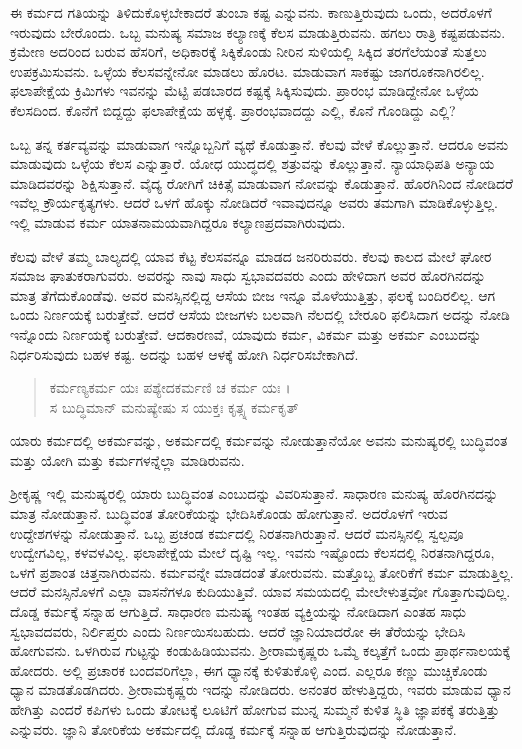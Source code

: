 ಈ ಕರ್ಮದ ಗತಿಯನ್ನು ತಿಳಿದುಕೊಳ್ಳಬೇಕಾದರೆ ತುಂಬಾ ಕಷ್ಟ ಎನ್ನುವನು. ಕಾಣುತ್ತಿರುವುದು ಒಂದು, ಅದರೊಳಗೆ ಇರುವುದು ಬೇರೊಂದು. ಒಬ್ಬ ಮನುಷ್ಯ ಸಮಾಜ ಕಲ್ಯಾಣಕ್ಕೆ ಕೆಲಸ ಮಾಡುತ್ತಿರುವನು. ಹಗಲು ರಾತ್ರಿ ಕಷ್ಟಪಡುವನು. ಕ್ರಮೇಣ ಅದರಿಂದ ಬರುವ ಹೆಸರಿಗೆ, ಅಧಿಕಾರಕ್ಕೆ ಸಿಕ್ಕಿಕೊಂಡು ನೀರಿನ ಸುಳಿಯಲ್ಲಿ ಸಿಕ್ಕಿದ ತರಗೆಲೆಯಂತೆ ಸುತ್ತಲು ಉಪಕ್ರಮಿಸುವನು. ಒಳ್ಳೆಯ ಕೆಲಸವನ್ನೇನೋ ಮಾಡಲು ಹೊರಟ. ಮಾಡುವಾಗ ಸಾಕಷ್ಟು ಜಾಗರೂಕನಾಗಿರಲಿಲ್ಲ. ಫಲಾಪೇಕ್ಷೆಯ ಕ್ರಿಮಿಗಳು ಇವನನ್ನು ಮೆಟ್ಟಿ ಪಡಬಾರದ ಕಷ್ಟಕ್ಕೆ ಸಿಕ್ಕಿಸುವುದು. ಪ್ರಾರಂಭ ಮಾಡಿದ್ದೇನೋ ಒಳ್ಳೆಯ ಕೆಲಸದಿಂದ. ಕೊನೆಗೆ ಬಿದ್ದದ್ದು ಫಲಾಪೇಕ್ಷೆಯ ಹಳ್ಳಕ್ಕೆ. ಪ್ರಾರಂಭವಾದದ್ದು ಎಲ್ಲಿ, ಕೊನೆ ಗೊಂಡಿದ್ದು ಎಲ್ಲಿ?

ಒಬ್ಬ ತನ್ನ ಕರ್ತವ್ಯವನ್ನು ಮಾಡುವಾಗ ಇನ್ನೊಬ್ಬನಿಗೆ ವ್ಯಥೆ ಕೊಡುತ್ತಾನೆ. ಕೆಲವು ವೇಳೆ ಕೊಲ್ಲುತ್ತಾನೆ. ಆದರೂ ಅವನು ಮಾಡುವುದು ಒಳ್ಳೆಯ ಕೆಲಸ ಎನ್ನುತ್ತಾರೆ. ಯೋಧ ಯುದ್ಧದಲ್ಲಿ ಶತ್ರುವನ್ನು ಕೊಲ್ಲುತ್ತಾನೆ. ನ್ಯಾಯಾಧಿಪತಿ ಅನ್ಯಾಯ ಮಾಡಿದವರನ್ನು ಶಿಕ್ಷಿಸುತ್ತಾನೆ. ವೈದ್ಯ ರೋಗಿಗೆ ಚಿಕಿತ್ಸೆ ಮಾಡುವಾಗ ನೋವನ್ನು ಕೊಡುತ್ತಾನೆ. ಹೊರಗಿನಿಂದ ನೋಡಿದರೆ ಇವೆಲ್ಲ ಕ್ರೌರ್ಯಕೃತ್ಯಗಳು. ಆದರೆ ಒಳಗೆ ಹೊಕ್ಕು ನೋಡಿದರೆ ಇವಾವುದನ್ನೂ ಅವರು ತಮಗಾಗಿ ಮಾಡಿಕೊಳ್ಳುತ್ತಿಲ್ಲ. ಇಲ್ಲಿ ಮಾಡುವ ಕರ್ಮ ಯಾತನಾಮಯವಾಗಿದ್ದರೂ ಕಲ್ಯಾಣಪ್ರದವಾಗಿರುವುದು.

ಕೆಲವು ವೇಳೆ ತಮ್ಮ ಬಾಲ್ಯದಲ್ಲಿ ಯಾವ ಕೆಟ್ಟ ಕೆಲಸವನ್ನೂ ಮಾಡದ ಜನರಿರುವರು. ಕೆಲವು ಕಾಲದ ಮೇಲೆ ಘೋರ ಸಮಾಜ ಘಾತುಕರಾಗುವರು. ಅವರನ್ನು ನಾವು ಸಾಧು ಸ್ವಭಾವದವರು ಎಂದು ಹೇಳಿದಾಗ ಅವರ ಹೊರಗಿನದನ್ನು ಮಾತ್ರ ತೆಗೆದುಕೊಂಡೆವು. ಅವರ ಮನಸ್ಸಿನಲ್ಲಿದ್ದ ಆಸೆಯ ಬೀಜ ಇನ್ನೂ ಮೊಳೆಯುತ್ತಿತ್ತು, ಫಲಕ್ಕೆ ಬಂದಿರಲಿಲ್ಲ. ಆಗ ಒಂದು ನಿರ್ಣಯಕ್ಕೆ ಬರುತ್ತೇವೆ. ಆದರೆ ಆಸೆಯ ಬೀಜಗಳು ಬಲವಾಗಿ ನೆಲದಲ್ಲಿ ಬೇರೂರಿ ಫಲಿಸಿದಾಗ ಅದನ್ನು ನೋಡಿ ಇನ್ನೊಂದು ನಿರ್ಣಯಕ್ಕೆ ಬರುತ್ತೇವೆ. ಆದಕಾರಣವೆ, ಯಾವುದು ಕರ್ಮ, ವಿಕರ್ಮ ಮತ್ತು ಅಕರ್ಮ ಎಂಬುದನ್ನು ನಿರ್ಧರಿಸುವುದು ಬಹಳ ಕಷ್ಟ. ಅದನ್ನು ಬಹಳ ಆಳಕ್ಕೆ ಹೋಗಿ ನಿರ್ಧರಿಸಬೇಕಾಗಿದೆ.

\begin{verse}
ಕರ್ಮಣ್ಯಕರ್ಮ ಯಃ ಪಶ್ಯೇದಕರ್ಮಣಿ ಚ ಕರ್ಮ ಯಃ ।\\ಸ ಬುದ್ಧಿಮಾನ್ ಮನುಷ್ಯೇಷು ಸ ಯುಕ್ತಃ ಕೃತ್ಸ್ನ ಕರ್ಮಕೃತ್ 
\end{verse}

{\small ಯಾರು ಕರ್ಮದಲ್ಲಿ ಅಕರ್ಮವನ್ನು, ಅಕರ್ಮದಲ್ಲಿ ಕರ್ಮವನ್ನು ನೋಡುತ್ತಾನೆಯೋ ಅವನು ಮನುಷ್ಯರಲ್ಲಿ ಬುದ್ಧಿವಂತ ಮತ್ತು ಯೋಗಿ ಮತ್ತು ಕರ್ಮಗಳನ್ನೆಲ್ಲಾ ಮಾಡಿರುವನು.}

ಶ್ರೀಕೃಷ್ಣ ಇಲ್ಲಿ ಮನುಷ್ಯರಲ್ಲಿ ಯಾರು ಬುದ್ಧಿವಂತ ಎಂಬುದನ್ನು ವಿವರಿಸುತ್ತಾನೆ. ಸಾಧಾರಣ ಮನುಷ್ಯ ಹೊರಗಿನದನ್ನು ಮಾತ್ರ ನೋಡುತ್ತಾನೆ. ಬುದ್ಧಿವಂತ ತೋರಿಕೆಯನ್ನು ಭೇದಿಸಿಕೊಂಡು ಹೋಗುತ್ತಾನೆ. ಅದರೊಳಗೆ ಇರುವ ಉದ್ದೇಶಗಳನ್ನು ನೋಡುತ್ತಾನೆ. ಒಬ್ಬ ಪ್ರಚಂಡ ಕರ್ಮದಲ್ಲಿ ನಿರತನಾಗಿರುತ್ತಾನೆ. ಆದರೆ ಮನಸ್ಸಿನಲ್ಲಿ ಸ್ವಲ್ಪವೂ ಉದ್ವೇಗವಿಲ್ಲ, ಕಳವಳವಿಲ್ಲ. ಫಲಾಪೇಕ್ಷೆಯ ಮೇಲೆ ದೃಷ್ಟಿ ಇಲ್ಲ. ಇವನು ಇಷ್ಟೊಂದು ಕೆಲಸದಲ್ಲಿ ನಿರತನಾಗಿದ್ದರೂ, ಒಳಗೆ ಪ್ರಶಾಂತ ಚಿತ್ತನಾಗಿರುವನು. ಕರ್ಮವನ್ನೇ ಮಾಡದಂತೆ ತೋರುವನು. ಮತ್ತೊಬ್ಬ ತೋರಿಕೆಗೆ ಕರ್ಮ ಮಾಡುತ್ತಿಲ್ಲ. ಆದರೆ ಮನಸ್ಸಿನೊಳಗೆ ಎಲ್ಲಾ ವಾಸನೆಗಳೂ ಕುದಿಯುತ್ತಿವೆ. ಯಾವ ಸಮಯದಲ್ಲಿ ಮೇಲೇಳುತ್ತವೋ ಗೊತ್ತಾಗುವುದಿಲ್ಲ. ದೊಡ್ಡ ಕರ್ಮಕ್ಕೆ ಸನ್ನಾಹ ಆಗುತ್ತಿದೆ. ಸಾಧಾರಣ ಮನುಷ್ಯ ಇಂತಹ ವ್ಯಕ್ತಿಯನ್ನು ನೋಡಿದಾಗ ಎಂತಹ ಸಾಧು ಸ್ವಭಾವದವರು, ನಿರ್ಲಿಪ್ತರು ಎಂದು ನಿರ್ಣಯಿಸಬಹುದು. ಆದರೆ ಜ್ಞಾನಿಯಾದರೋ ಈ ತೆರೆಯನ್ನು ಭೇದಿಸಿ ಹೋಗುವನು. ಒಳಗಿರುವ ಗುಟ್ಟನ್ನು ಕಂಡುಹಿಡಿಯುವನು. ಶ್ರೀರಾಮಕೃಷ್ಣರು ಒಮ್ಮೆ ಕಲ್ಕತ್ತೆಗೆ ಒಂದು ಪ್ರಾರ್ಥನಾಲಯಕ್ಕೆ ಹೋದರು. ಅಲ್ಲಿ ಪ್ರಚಾರಕ ಬಂದವರಿಗೆಲ್ಲಾ, ಈಗ ಧ್ಯಾನಕ್ಕೆ ಕುಳಿತುಕೊಳ್ಳಿ ಎಂದ. ಎಲ್ಲರೂ ಕಣ್ಣು ಮುಚ್ಚಿಕೊಂಡು ಧ್ಯಾನ ಮಾಡತೊಡಗಿದರು. ಶ್ರೀರಾಮಕೃಷ್ಣರು ಇದನ್ನು ನೋಡಿದರು. ಅನಂತರ ಹೇಳುತ್ತಿದ್ದರು, ಇವರು ಮಾಡುವ ಧ್ಯಾನ ಹೇಗಿತ್ತು ಎಂದರೆ ಕಪಿಗಳು ಒಂದು ತೋಟಕ್ಕೆ ಲೂಟಿಗೆ ಹೋಗುವ ಮುನ್ನ ಸುಮ್ಮನೆ ಕುಳಿತ ಸ್ಥಿತಿ ಜ್ಞಾಪಕಕ್ಕೆ ತರುತ್ತಿತ್ತು ಎನ್ನುವರು. ಜ್ಞಾನಿ ತೋರಿಕೆಯ ಅಕರ್ಮದಲ್ಲಿ ದೊಡ್ಡ ಕರ್ಮಕ್ಕೆ ಸನ್ನಾಹ ಆಗುತ್ತಿರುವುದನ್ನು ನೋಡುತ್ತಾನೆ.

